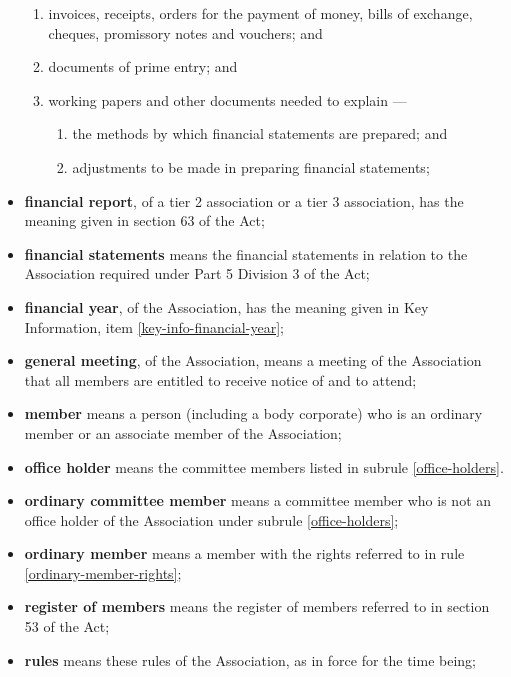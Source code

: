 \documentclass[../constitution.tex]{subfiles}
\begin{document}
\begin{itemize}[label={-}]
        \begin{enumerate}[label=\alph*)]

          \item invoices, receipts, orders for the payment of money, bills of exchange, cheques, promissory notes and vouchers; and
          \item documents of prime entry; and
          \item working papers and other documents needed to explain ---
                \begin{enumerate}[label=\roman*)]
                  \item the methods by which financial statements are prepared; and
                  \item adjustments to be made in preparing financial statements;
                \end{enumerate}
        \end{enumerate}
  \item \textbf{financial report}, of a tier 2 association or a tier 3 association, has the meaning given in section 63 of the Act;
  \item \textbf{financial statements} means the financial statements in relation to the Association required under Part 5 Division 3 of the Act;
  \item \textbf{financial year}, of the Association, has the meaning given in Key Information, item \ref{key-info-financial-year};
  \item \textbf{general meeting}, of the Association, means a meeting of the Association that all members are entitled to receive notice of and to attend;
  \item \textbf{member} means a person (including a body corporate) who is an ordinary member or an associate member of the Association;
  \item \textbf{office holder} means the committee members listed in subrule \ref{office-holders}.
  \item \textbf{ordinary committee member} means a committee member who is not an office holder of the Association under subrule \ref{office-holders};
  \item \textbf{ordinary member} means a member with the rights referred to in rule \ref{ordinary-member-rights};
  \item \textbf{register of members} means the register of members referred to in section 53 of the Act;
  \item \textbf{rules} means these rules of the Association, as in force for the time being;

\end{itemize}
\end{document}
